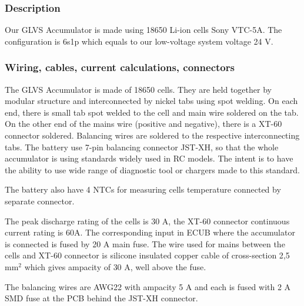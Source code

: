 \subsubsection{Description}
Our GLVS Accumulator is made using 18650 Li-ion cells Sony VTC-5A. The configuration is 6s1p which equals to our low-voltage system voltage 24 V.

\subsubsection{Wiring, cables, current calculations, connectors}

The GLVS Accumulator is made of 18650 cells. They are held together by modular structure and interconnected by nickel tabs using spot welding. On each end, there is small tab spot welded to the cell and main wire soldered on the tab. On the other end of the mains wire (positive and negative), there is a XT-60 connector soldered. Balancing wires are soldered to the respective interconnecting tabs. The battery use 7-pin balancing connector JST-XH, so that the whole accumulator is using standards widely used in RC models. The intent is to have the ability to use wide range of diagnostic tool or chargers made to this standard.

The battery also have 4 NTCs for measuring cells temperature connected by separate connector.

The peak discharge rating of the cells is 30 A, the XT-60 connector continuous current rating is 60A. The corresponding input in ECUB where the accumulator is connected is fused by 20 A main fuse. The wire used for mains between the cells and XT-60 connector is silicone insulated copper cable of cross-section 2,5 mm$^2$ which gives ampacity of 30 A, well above the fuse.

The balancing wires are AWG22 with ampacity 5 A and each is fused with 2 A SMD fuse at the PCB behind the JST-XH connector.

